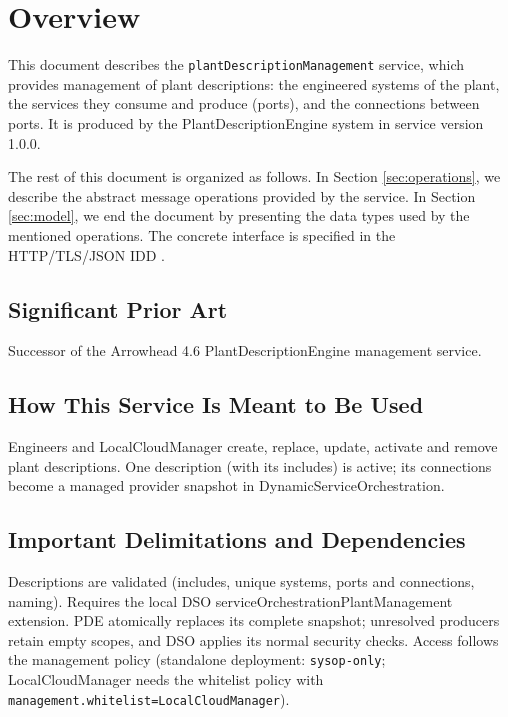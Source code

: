 \documentclass[a4paper]{arrowhead}
\begin{document}
\section{Overview}
\label{sec:overview}

This document describes the \texttt{plant\allowbreak{}Description\allowbreak{}Management} service, which provides management of plant descriptions: the engineered systems of the plant, the services they consume and produce (ports), and the connections between ports.
It is produced by the PlantDescriptionEngine system \cite{pde-sysd} in service version 1.0.0.

The rest of this document is organized as follows.
In Section \ref{sec:operations}, we describe the abstract message operations provided by the service.
In Section \ref{sec:model}, we end the document by presenting the data types used by the mentioned operations.
The concrete interface is specified in the HTTP/TLS/JSON IDD \cite{pde-plantDescriptionManagement-http-idd}.

\subsection{Significant Prior Art}

Successor of the Arrowhead 4.6 Plant\allowbreak{}Description\allowbreak{}Engine management service.

\subsection{How This Service Is Meant to Be Used}

Engineers and LocalCloudManager create, replace, update, activate and remove plant descriptions. One description (with its includes) is active; its connections become a managed provider snapshot in Dynamic\allowbreak{}Service\allowbreak{}Orchestration.

\subsection{Important Delimitations and Dependencies}
\label{sec:delimitations}

Descriptions are validated (includes, unique systems, ports and connections, naming). Requires the local DSO service\allowbreak{}Orchestration\allowbreak{}Plant\allowbreak{}Management extension. PDE atomically replaces its complete snapshot; unresolved producers retain empty scopes, and DSO applies its normal security checks. Access follows the management policy (standalone deployment: \texttt{sysop-\allowbreak{}only}; LocalCloudManager needs the whitelist policy with \texttt{management.\allowbreak{}whitelist=\allowbreak{}LocalCloudManager}).
\end{document}
